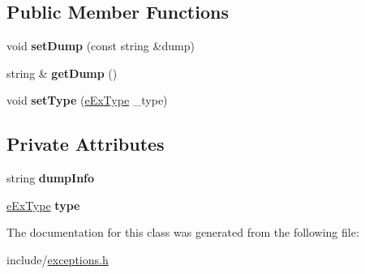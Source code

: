 \subsection*{\-Public \-Member \-Functions}
\begin{DoxyCompactItemize}
\item 
\hypertarget{classcVMMExc_a4938e323f705ecab71ce085a168d5b32}{void {\bfseries set\-Dump} (const string \&dump)}\label{d7/d66/classcVMMExc_a4938e323f705ecab71ce085a168d5b32}

\item 
\hypertarget{classcVMMExc_ab345080afee042ba95a1a1212c54e922}{string \& {\bfseries get\-Dump} ()}\label{d7/d66/classcVMMExc_ab345080afee042ba95a1a1212c54e922}

\item 
\hypertarget{classcVMMExc_af3f08d9ed3c9e930899030b698377e70}{void {\bfseries set\-Type} (\hyperlink{exceptions_8h_a5cf02777e008e49ed78b878634829334}{e\-Ex\-Type} \-\_\-type)}\label{d7/d66/classcVMMExc_af3f08d9ed3c9e930899030b698377e70}

\end{DoxyCompactItemize}
\subsection*{\-Private \-Attributes}
\begin{DoxyCompactItemize}
\item 
\hypertarget{classcVMMExc_ae96d6468514fae87b6828fe12ff71b0b}{string {\bfseries dump\-Info}}\label{d7/d66/classcVMMExc_ae96d6468514fae87b6828fe12ff71b0b}

\item 
\hypertarget{classcVMMExc_ae6cf4fd33e74fd401f0c35940e867294}{\hyperlink{exceptions_8h_a5cf02777e008e49ed78b878634829334}{e\-Ex\-Type} {\bfseries type}}\label{d7/d66/classcVMMExc_ae6cf4fd33e74fd401f0c35940e867294}

\end{DoxyCompactItemize}


\-The documentation for this class was generated from the following file\-:\begin{DoxyCompactItemize}
\item 
include/\hyperlink{exceptions_8h}{exceptions.\-h}\end{DoxyCompactItemize}
